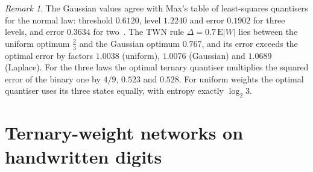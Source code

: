 \documentclass[11pt]{article}
\theoremstyle{definition}\newtheorem{definition}[theorem]{Definition}
\theoremstyle{remark}\newtheorem{remark}[theorem]{Remark}
\begin{document}
\begin{remark}
The Gaussian values agree with Max's table of least-squares quantisers for the normal law: threshold $0.6120$, level $1.2240$ and error $0.1902$ for three levels, and error $0.3634$ for two~\cite{max1960}. The TWN rule $\Delta=0.7\,\mathrm E|W|$ lies between the uniform optimum $\frac23$ and the Gaussian optimum $0.767$, and its error exceeds the optimal error by factors $1.0038$ (uniform), $1.0076$ (Gaussian) and $1.0689$ (Laplace). For the three laws the optimal ternary quantiser multiplies the squared error of the binary one by $4/9$, $0.523$ and $0.528$. For uniform weights the optimal quantiser uses its three states equally, with entropy exactly $\log_{2}3$.
\end{remark}

\section{Ternary-weight networks on handwritten digits}\label{sec:twn}
\end{document}
